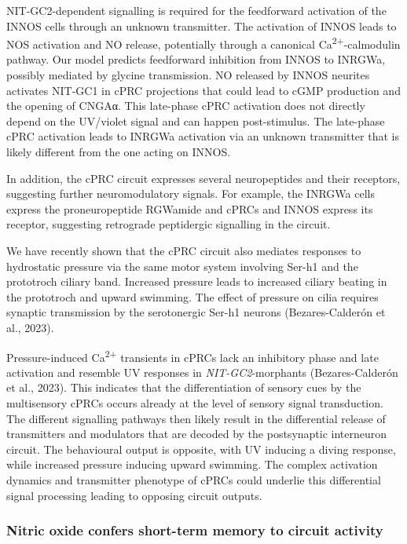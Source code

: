 \documentclass[
  11pt,
  letterpaper,
  DIV=11,
  numbers=noendperiod]{scrartcl}
\begin{document}
NIT-GC2-dependent signalling is required for the feedforward activation
of the INNOS cells through an unknown transmitter. The activation of
INNOS leads to NOS activation and NO release, potentially through a
canonical Ca\textsuperscript{2+}-calmodulin pathway. Our model predicts
feedforward inhibition from INNOS to INRGWa, possibly mediated by
glycine transmission. NO released by INNOS neurites activates NIT-GC1 in
cPRC projections that could lead to cGMP production and the opening of
CNGAα. This late-phase cPRC activation does not directly depend on the
UV/violet signal and can happen post-stimulus. The late-phase cPRC
activation leads to INRGWa activation via an unknown transmitter that is
likely different from the one acting on INNOS.

In addition, the cPRC circuit expresses several neuropeptides and their
receptors, suggesting further neuromodulatory signals. For example, the
INRGWa cells express the proneuropeptide RGWamide and cPRCs and INNOS
express its receptor, suggesting retrograde peptidergic signalling in
the circuit.

We have recently shown that the cPRC circuit also mediates responses to
hydrostatic pressure via the same motor system involving Ser-h1 and the
prototroch ciliary band. Increased pressure leads to increased ciliary
beating in the prototroch and upward swimming. The effect of pressure on
cilia requires synaptic transmission by the serotonergic Ser-h1 neurons
(Bezares-Calderón et al., 2023).

Pressure-induced Ca\textsuperscript{2+} transients in cPRCs lack an
inhibitory phase and late activation and resemble UV responses in
\emph{NIT-GC2}-morphants (Bezares-Calderón et al., 2023). This indicates
that the differentiation of sensory cues by the multisensory cPRCs
occurs already at the level of sensory signal transduction. The
different signalling pathways then likely result in the differential
release of transmitters and modulators that are decoded by the
postsynaptic interneuron circuit. The behavioural output is opposite,
with UV inducing a diving response, while increased pressure inducing
upward swimming. The complex activation dynamics and transmitter
phenotype of cPRCs could underlie this differential signal processing
leading to opposing circuit outputs.

\subsubsection{Nitric oxide confers short-term memory to circuit
activity}\label{nitric-oxide-confers-short-term-memory-to-circuit-activity}
\end{document}
